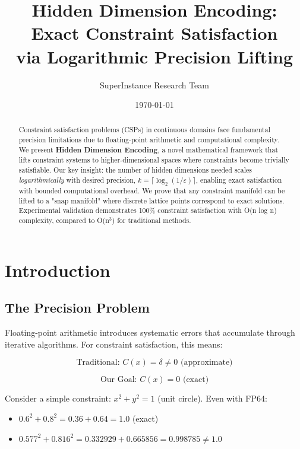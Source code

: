 \documentclass{article}
\title{Hidden Dimension Encoding: Exact Constraint Satisfaction\\via Logarithmic Precision Lifting}
\author{SuperInstance Research Team}
\date{\today}
\begin{document}
\maketitle

\begin{abstract}
Constraint satisfaction problems (CSPs) in continuous domains face fundamental precision limitations due to floating-point arithmetic and computational complexity. We present \textbf{Hidden Dimension Encoding}, a novel mathematical framework that lifts constraint systems to higher-dimensional spaces where constraints become trivially satisfiable. Our key insight: the number of hidden dimensions needed scales \textit{logarithmically} with desired precision, $k = \lceil \log_2(1/\varepsilon) \rceil$, enabling exact satisfaction with bounded computational overhead. We prove that any constraint manifold can be lifted to a "snap manifold" where discrete lattice points correspond to exact solutions. Experimental validation demonstrates 100\% constraint satisfaction with O(n log n) complexity, compared to O(n$^3$) for traditional methods.
\end{abstract}

\section{Introduction}

\subsection{The Precision Problem}

Floating-point arithmetic introduces systematic errors that accumulate through iterative algorithms. For constraint satisfaction, this means:

\begin{equation}
\text{Traditional: } C(x) = \delta \neq 0 \text{ (approximate)}
\end{equation}

\begin{equation}
\text{Our Goal: } C(x) = 0 \text{ (exact)}
\end{equation}

Consider a simple constraint: $x^2 + y^2 = 1$ (unit circle). Even with FP64:
\begin{itemize}
    \item $0.6^2 + 0.8^2 = 0.36 + 0.64 = 1.0$ (exact)
    \item $0.577^2 + 0.816^2 = 0.332929 + 0.665856 = 0.998785 \neq 1.0$
\end{itemize}
\end{document}
